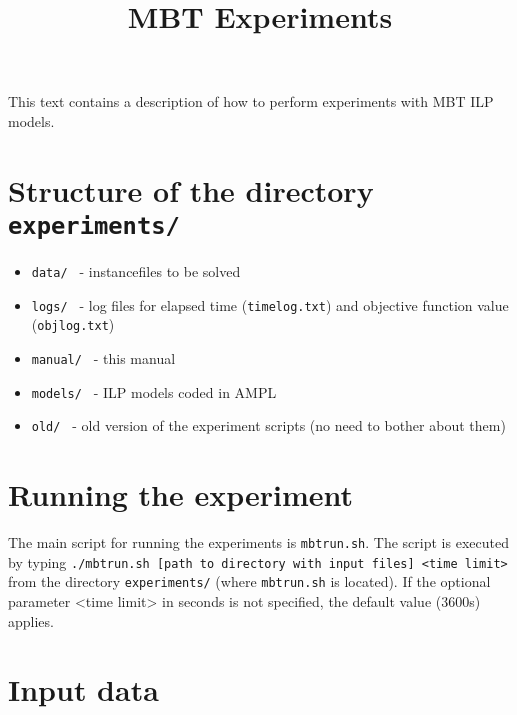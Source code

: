 \documentclass[12pt]{article}
\title{MBT Experiments}
\begin{document}
\maketitle
This text contains a description of how to perform experiments with MBT ILP models.

\section{Structure of the directory \texttt{experiments/}}
\begin{itemize}
	\item\texttt{data/ } - instancefiles to be solved
	\item\texttt{logs/ } - log files for elapsed time (\texttt{timelog.txt}) and objective function value (\texttt{objlog.txt})
	\item\texttt{manual/ } - this manual
	\item\texttt{models/ } - ILP models coded in AMPL
	\item\texttt{old/ } - old version of the experiment scripts (no need to bother about them)
\end{itemize}

\section{Running the experiment}

The main script for running the experiments is \texttt{mbtrun.sh}.
The script is executed by typing \newline\newline
\texttt{./mbtrun.sh [path to directory with input files] <time limit> }\newline\newline
from the directory \texttt{experiments/} (where \texttt{mbtrun.sh} is located).
If the optional parameter <time limit> in seconds is not specified, the default value (3600s) applies.

\section{Input data}
\end{document}
